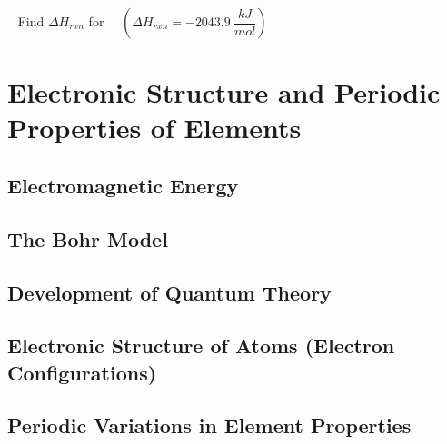 \documentclass[12pt, openany, letterpaper]{memoir}
\begin{document}
\begin{itemize}
\begin{itemize}
        ~\hphantom{Practice:} Find $\Delta H_{rxn}$ for~~  \hspace{1em} $\left(\Delta H_{rxn}=-2043.9~\dfrac{kJ}{mol}\right)$
    \end{itemize}
\end{itemize}

\chapter{Electronic Structure and Periodic Properties of Elements}

\section{Electromagnetic Energy}

\section{The Bohr Model}

\section{Development of Quantum Theory}

\section{Electronic Structure of Atoms (Electron Configurations)}

\section{Periodic Variations in Element Properties}
\end{document}
